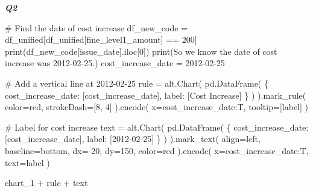 \documentclass[
  letterpaper,
  DIV=11,
  numbers=noendperiod]{scrartcl}
\newenvironment{Shaded}{\begin{snugshade}}{\end{snugshade}}
\newcommand{\BuiltInTok}[1]{\textcolor[rgb]{0.00,0.23,0.31}{#1}}
\newcommand{\CommentTok}[1]{\textcolor[rgb]{0.37,0.37,0.37}{#1}}
\newcommand{\DecValTok}[1]{\textcolor[rgb]{0.68,0.00,0.00}{#1}}
\newcommand{\NormalTok}[1]{\textcolor[rgb]{0.00,0.23,0.31}{#1}}
\newcommand{\OperatorTok}[1]{\textcolor[rgb]{0.37,0.37,0.37}{#1}}
\newcommand{\StringTok}[1]{\textcolor[rgb]{0.13,0.47,0.30}{#1}}
\begin{document}
\textbf{\emph{Q2}}

\begin{Shaded}
\begin{Highlighting}[]
\CommentTok{\# Find the date of cost increase}
\NormalTok{df\_new\_code }\OperatorTok{=}\NormalTok{ df\_unified[df\_unified[}\StringTok{\textquotesingle{}fine\_level1\_amount\textquotesingle{}}\NormalTok{] }\OperatorTok{==} \DecValTok{200}\NormalTok{]}
\BuiltInTok{print}\NormalTok{(df\_new\_code[}\StringTok{\textquotesingle{}issue\_date\textquotesingle{}}\NormalTok{].iloc[}\DecValTok{0}\NormalTok{])}
\BuiltInTok{print}\NormalTok{(}\StringTok{\textquotesingle{}So we know the date of cost increase was 2012{-}02{-}25.\textquotesingle{}}\NormalTok{)}
\NormalTok{cost\_increase\_date }\OperatorTok{=} \StringTok{\textquotesingle{}2012{-}02{-}25\textquotesingle{}}

\CommentTok{\# Add a vertical line at 2012{-}02{-}25}
\NormalTok{rule }\OperatorTok{=}\NormalTok{ alt.Chart(}
\NormalTok{    pd.DataFrame(}
\NormalTok{        \{}
            \StringTok{\textquotesingle{}cost\_increase\_date\textquotesingle{}}\NormalTok{: [cost\_increase\_date], }
            \StringTok{\textquotesingle{}label\textquotesingle{}}\NormalTok{: [}\StringTok{\textquotesingle{}Cost Increase\textquotesingle{}}\NormalTok{]}
\NormalTok{            \}}
\NormalTok{        )}
\NormalTok{    ).mark\_rule(}
\NormalTok{    color}\OperatorTok{=}\StringTok{\textquotesingle{}red\textquotesingle{}}\NormalTok{,}
\NormalTok{    strokeDash}\OperatorTok{=}\NormalTok{[}\DecValTok{8}\NormalTok{, }\DecValTok{4}\NormalTok{]}
\NormalTok{).encode(}
\NormalTok{    x}\OperatorTok{=}\StringTok{\textquotesingle{}cost\_increase\_date:T\textquotesingle{}}\NormalTok{,}
\NormalTok{    tooltip}\OperatorTok{=}\NormalTok{[}\StringTok{\textquotesingle{}label\textquotesingle{}}\NormalTok{]}
\NormalTok{)}

\CommentTok{\# Label for cost increase}
\NormalTok{text }\OperatorTok{=}\NormalTok{ alt.Chart(}
\NormalTok{    pd.DataFrame(}
\NormalTok{        \{}
            \StringTok{\textquotesingle{}cost\_increase\_date\textquotesingle{}}\NormalTok{: [cost\_increase\_date], }
            \StringTok{\textquotesingle{}label\textquotesingle{}}\NormalTok{: [}\StringTok{\textquotesingle{}2012{-}02{-}25\textquotesingle{}}\NormalTok{]}
\NormalTok{            \}}
\NormalTok{        )}
\NormalTok{    ).mark\_text(}
\NormalTok{    align}\OperatorTok{=}\StringTok{\textquotesingle{}left\textquotesingle{}}\NormalTok{,}
\NormalTok{    baseline}\OperatorTok{=}\StringTok{\textquotesingle{}bottom\textquotesingle{}}\NormalTok{,}
\NormalTok{    dx}\OperatorTok{={-}}\DecValTok{20}\NormalTok{,}
\NormalTok{    dy}\OperatorTok{=}\DecValTok{150}\NormalTok{,}
\NormalTok{    color}\OperatorTok{=}\StringTok{\textquotesingle{}red\textquotesingle{}}
\NormalTok{).encode(}
\NormalTok{    x}\OperatorTok{=}\StringTok{\textquotesingle{}cost\_increase\_date:T\textquotesingle{}}\NormalTok{,}
\NormalTok{    text}\OperatorTok{=}\StringTok{\textquotesingle{}label\textquotesingle{}}
\NormalTok{)}

\NormalTok{chart\_1 }\OperatorTok{+}\NormalTok{ rule }\OperatorTok{+}\NormalTok{ text}
\end{Highlighting}
\end{Shaded}
\end{document}

